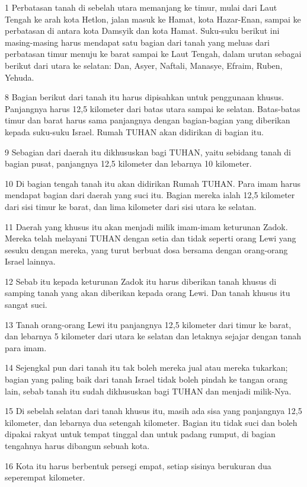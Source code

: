 \par 1 Perbatasan tanah di sebelah utara memanjang ke timur, mulai dari Laut Tengah ke arah kota Hetlon, jalan masuk ke Hamat, kota Hazar-Enan, sampai ke perbatasan di antara kota Damsyik dan kota Hamat. Suku-suku berikut ini masing-masing harus mendapat satu bagian dari tanah yang meluas dari perbatasan timur menuju ke barat sampai ke Laut Tengah, dalam urutan sebagai berikut dari utara ke selatan: Dan, Asyer, Naftali, Manasye, Efraim, Ruben, Yehuda.
\par 8 Bagian berikut dari tanah itu harus dipisahkan untuk penggunaan khusus. Panjangnya harus 12,5 kilometer dari batas utara sampai ke selatan. Batas-batas timur dan barat harus sama panjangnya dengan bagian-bagian yang diberikan kepada suku-suku Israel. Rumah TUHAN akan didirikan di bagian itu.
\par 9 Sebagian dari daerah itu dikhususkan bagi TUHAN, yaitu sebidang tanah di bagian pusat, panjangnya 12,5 kilometer dan lebarnya 10 kilometer.
\par 10 Di bagian tengah tanah itu akan didirikan Rumah TUHAN. Para imam harus mendapat bagian dari daerah yang suci itu. Bagian mereka ialah 12,5 kilometer dari sisi timur ke barat, dan lima kilometer dari sisi utara ke selatan.
\par 11 Daerah yang khusus itu akan menjadi milik imam-imam keturunan Zadok. Mereka telah melayani TUHAN dengan setia dan tidak seperti orang Lewi yang sesuku dengan mereka, yang turut berbuat dosa bersama dengan orang-orang Israel lainnya.
\par 12 Sebab itu kepada keturunan Zadok itu harus diberikan tanah khusus di samping tanah yang akan diberikan kepada orang Lewi. Dan tanah khusus itu sangat suci.
\par 13 Tanah orang-orang Lewi itu panjangnya 12,5 kilometer dari timur ke barat, dan lebarnya 5 kilometer dari utara ke selatan dan letaknya sejajar dengan tanah para imam.
\par 14 Sejengkal pun dari tanah itu tak boleh mereka jual atau mereka tukarkan; bagian yang paling baik dari tanah Israel tidak boleh pindah ke tangan orang lain, sebab tanah itu sudah dikhususkan bagi TUHAN dan menjadi milik-Nya.
\par 15 Di sebelah selatan dari tanah khusus itu, masih ada sisa yang panjangnya 12,5 kilometer, dan lebarnya dua setengah kilometer. Bagian itu tidak suci dan boleh dipakai rakyat untuk tempat tinggal dan untuk padang rumput, di bagian tengahnya harus dibangun sebuah kota.
\par 16 Kota itu harus berbentuk persegi empat, setiap sisinya berukuran dua seperempat kilometer.
